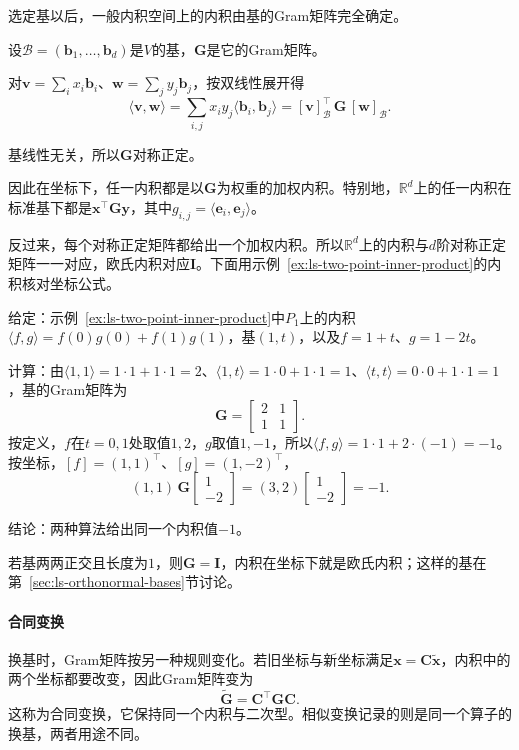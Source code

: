 选定基以后，一般内积空间上的内积由基的Gram矩阵完全确定。

设$\mathcal B=(\bm b_1,\ldots,\bm b_d)$是$V$的基，$\bm G$是它的Gram矩阵。

对$\bm v=\sum_ix_i\bm b_i$、$\bm w=\sum_jy_j\bm b_j$，按双线性展开得
\[
 \langle\bm v,\bm w\rangle=\sum_{i,j}x_iy_j\langle\bm b_i,\bm b_j\rangle=[\bm v]_{\mathcal B}^\top\,\bm G\,[\bm w]_{\mathcal B}.
\]

基线性无关，所以$\bm G$对称正定。

因此在坐标下，任一内积都是以$\bm G$为权重的加权内积。特别地，$\mathbb R^d$上的任一内积在标准基下都是$\bm x^\top\bm G\bm y$，其中$g_{i,j}=\langle\bm e_i,\bm e_j\rangle$。

反过来，每个对称正定矩阵都给出一个加权内积。所以$\mathbb R^d$上的内积与$d$阶对称正定矩阵一一对应，欧氏内积对应$\bm I$。下面用示例~\ref{ex:ls-two-point-inner-product}的内积核对坐标公式。
\begin{example}[两点内积的坐标计算]
\label{ex:ls-two-point-inner-product-coordinates}
给定：示例~\ref{ex:ls-two-point-inner-product}中$P_1$上的内积$\langle f,g\rangle=f(0)g(0)+f(1)g(1)$，基$(1,t)$，以及$f=1+t$、$g=1-2t$。

计算：由$\langle1,1\rangle=1\cdot1+1\cdot1=2$、$\langle1,t\rangle=1\cdot0+1\cdot1=1$、$\langle t,t\rangle=0\cdot0+1\cdot1=1$，基的Gram矩阵为
\[
 \bm G=\begin{bmatrix}2&1\\1&1\end{bmatrix}.
\]
按定义，$f$在$t=0,1$处取值$1,2$，$g$取值$1,-1$，所以$\langle f,g\rangle=1\cdot1+2\cdot(-1)=-1$。按坐标，$[f]=(1,1)^\top$、$[g]=(1,-2)^\top$，
\[
 (1,1)\,\bm G\begin{bmatrix}1\\-2\end{bmatrix}=(3,2)\begin{bmatrix}1\\-2\end{bmatrix}=-1 .
\]

结论：两种算法给出同一个内积值$-1$。
\end{example}
若基两两正交且长度为$1$，则$\bm G=\bm I$，内积在坐标下就是欧氏内积；这样的基在第~\ref{sec:ls-orthonormal-bases}节讨论。

\paragraph{合同变换} 
换基时，Gram矩阵按另一种规则变化。若旧坐标与新坐标满足$\bm x=\bm C\widetilde{\bm x}$，内积中的两个坐标都要改变，因此Gram矩阵变为
\[
 \widetilde{\bm G}=\bm C^\top\bm G\bm C.
\]
这称为合同变换，它保持同一个内积与二次型。相似变换记录的则是同一个算子的换基，两者用途不同。

